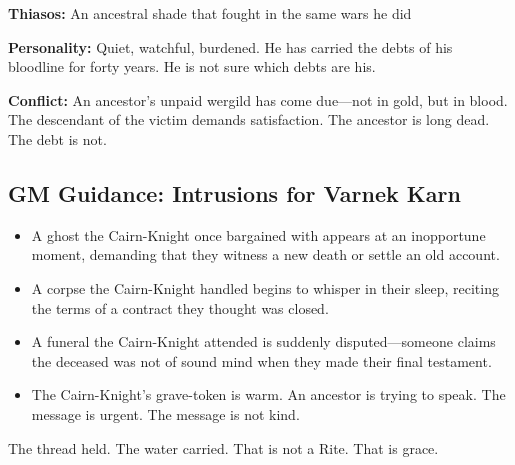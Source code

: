 \textbf{Thiasos:} An ancestral shade that fought in the same wars he did

\textbf{Personality:} Quiet, watchful, burdened. He has carried the debts of his bloodline for forty years. He is not sure which debts are his.

\textbf{Conflict:} An ancestor's unpaid wergild has come due—not in gold, but in blood. The descendant of the victim demands satisfaction. The ancestor is long dead. The debt is not.

\subsection{GM Guidance: Intrusions for Varnek Karn}

\begin{itemize}
\item A ghost the Cairn-Knight once bargained with appears at an inopportune moment, demanding that they witness a new death or settle an old account.
\item A corpse the Cairn-Knight handled begins to whisper in their sleep, reciting the terms of a contract they thought was closed.
\item A funeral the Cairn-Knight attended is suddenly disputed—someone claims the deceased was not of sound mind when they made their final testament.
\item The Cairn-Knight's grave-token is warm. An ancestor is trying to speak. The message is urgent. The message is not kind.
\end{itemize}

The thread held. The water carried. That is not a Rite. That is grace.
